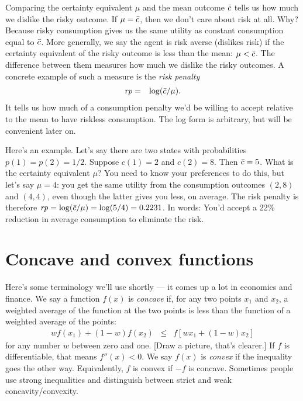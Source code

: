 Comparing the certainty equivalent $\mu$ and the mean outcome $\bar{c}$
tells us how much we dislike the risky outcome.
If $\mu = \bar{c}$,
then we don't care about risk at all.
Why?
Because risky consumption gives us the same
utility as constant consumption equal to $\bar{c}$.
More generally, we say the agent is risk averse (dislikes risk)
if the certainty equivalent of the risky outcome
is less than the mean:   $\mu < \bar{c}$.
The difference between them measures how much we dislike the risky outcomes.
A concrete example of such a measure is the {\it risk penalty\/}
\begin{eqnarray}
    \mbox{\em rp\/} &=& \log (\bar{c}/\mu)  .
    \label{eq:rp-def}
\end{eqnarray}
It tells us how much of a consumption penalty we'd be willing to accept
relative to the mean to have riskless consumption.
The log form is arbitrary, but will be convenient later on.

Here's an example.
Let's say there are two states with probabilities
$p(1) = p(2) = 1/2$.
Suppose $c(1) = 2$ and $c(2) = 8$.
Then $\bar{c} = 5$.
What is the certainty equivalent $\mu$?
You need to know your preferences to do this,
but let's say $\mu = 4$:  you get the same utility
from the consumption outcomes $(2,8)$ and $(4,4)$,
even though the latter gives you less, on average.
The risk penalty is therefore
$ \mbox{\em rp\/} = \log (\bar{c}/\mu) = \log(5/4) = 0.2231$.
In words: You'd accept a 22\% reduction in average consumption to eliminate the risk.


\section{Concave and convex functions}

Here's some terminology we'll use shortly --- it comes up a lot
in economics and finance.
We say a function $f(x)$ is {\it concave\/}
if, for any two points $x_1$ and $x_2$,
a weighted average of the function at the two points
is less than the function of a weighted average of the points:
\begin{eqnarray}
    w f(x_1) + (1-w) f(x_2) &\leq& f[ w x_1 + (1-w) x_2]
    \label{eq:concave-def}
\end{eqnarray}
for any number $w$ between zero and one.
[Draw a picture, that's clearer.]
If $f$ is differentiable, that means $f''(x) < 0$.
We say $f(x)$ is  {\it convex\/}
if the inequality goes the other way.
Equivalently, $f$ is convex if $-f$ is concave.
Sometimes people use strong inequalities and distinguish
between strict and weak concavity/convexity.

